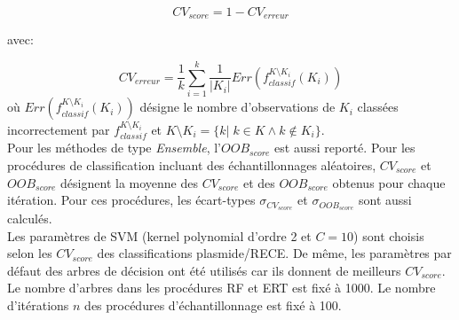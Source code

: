 \begin{equation}
	CV_{score}=1-CV_{erreur}
\end{equation}

avec:

\begin{equation}
	CV_{erreur}=\frac{1}{k}\sum_{i=1}^{k}\frac{1}{|K_{i}|}Err(f_{classif}^{K\setminus K_{i}}(K_{i}))
\end{equation}	   
où $Err(f_{classif}^{K\setminus K_{i}}(K_{i}))$ désigne le nombre d'observations de $K_{i}$ classées incorrectement par $f_{classif}^{K\setminus K_{i}}$ et $K\setminus K_{i}=\{k|\;k \in K \wedge k \notin K_{i}\}$.\\

	Pour les méthodes de type \textit{Ensemble}, l'$OOB_{score}$ est aussi reporté. Pour les procédures de classification incluant des échantillonnages aléatoires, $CV_{score}$ et $OOB_{score}$ désignent la moyenne des $CV_{score}$ et des $OOB_{score}$ obtenus pour chaque itération. Pour ces procédures, les écart-types $\sigma_{CV_{score}}$ et $\sigma_{OOB_{score}}$ sont aussi calculés.\\
Les paramètres de SVM (kernel polynomial d'ordre 2 et $C=10$) sont choisis selon les $CV_{score}$ des classifications plasmide/RECE. De même, les paramètres par défaut des arbres de décision ont été utilisés car ils donnent de meilleurs $CV_{score}$. Le nombre d'arbres dans les procédures RF et ERT est fixé à 1000. Le nombre d'itérations $n$ des procédures d'échantillonnage est fixé à 100.\\
	 
